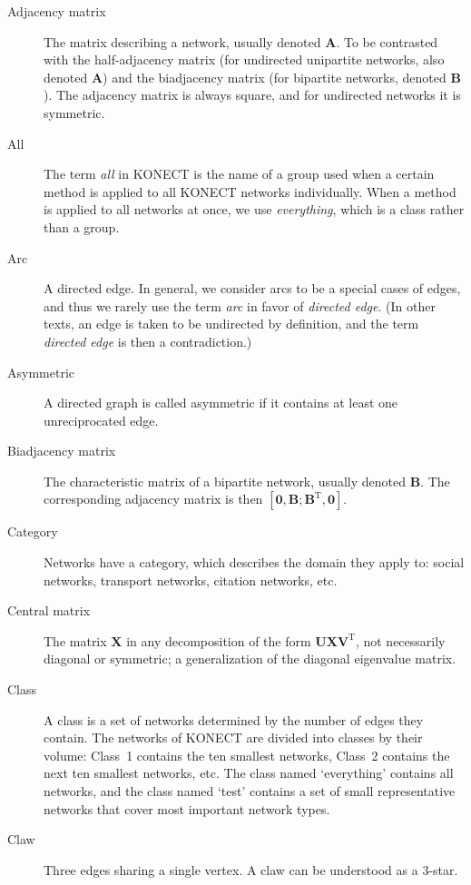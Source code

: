 \documentclass{article}
\begin{document}
\begin{description}
  \item[Adjacency matrix]
    The matrix describing a network, usually denoted $\mathbf A$.  To be
    contrasted with the 
    half-adjacency matrix (for undirected unipartite networks, also
    denoted $\mathbf A$) and the
    biadjacency matrix (for bipartite networks, denoted $\mathbf B$). 
    The adjacency matrix is always square, and for undirected networks
    it is symmetric. 
  \item[All] The term \emph{all} in KONECT is the name of a group used when a certain method
    is applied to all KONECT networks individually.  When a method is
    applied to all networks at once, we use \emph{everything}, which is
    a class rather than a group. 
  \item[Arc] A directed edge.  In general, we consider arcs to be a
    special cases of edges, and thus we rarely use the term \emph{arc}
    in favor of \emph{directed edge}.  (In other texts, an edge is taken
    to be undirected by definition, and the term \emph{directed edge} is
    then a contradiction.)
  \item[Asymmetric] A directed graph is called asymmetric if it contains
    at least one unreciprocated edge. 
  \item[Biadjacency matrix]
    The characteristic matrix of a bipartite network, usually denoted
    $\mathbf B$.  The corresponding adjacency matrix is then $[\mathbf
      0, \mathbf B; \mathbf B^{\mathrm T}, \mathbf 0]$. 
  \item[Category] Networks have a category, which describes the domain
    they apply to:  social networks, transport networks, citation
    networks, etc. 
  \item[Central matrix] The matrix $\mathbf X$ in any decomposition
    of the form $\mathbf U \mathbf X \mathbf V^{\mathrm T}$, not necessarily
    diagonal or symmetric; a generalization of the diagonal eigenvalue
    matrix.
  \item[Class]
    A class is a set of networks determined by the number of edges they
    contain. 
    The networks of KONECT are divided into classes by their volume:
    Class~1 contains the ten smallest networks, Class~2 contains the
    next ten smallest networks, etc.  The class named `everything' contains all
    networks, and the class named `test' contains a set of small
    representative networks that cover most important network types. 
  \item[Claw]
    Three edges sharing a single vertex.  A claw can be understood as a 3-star. 

\end{description}
\end{document}
